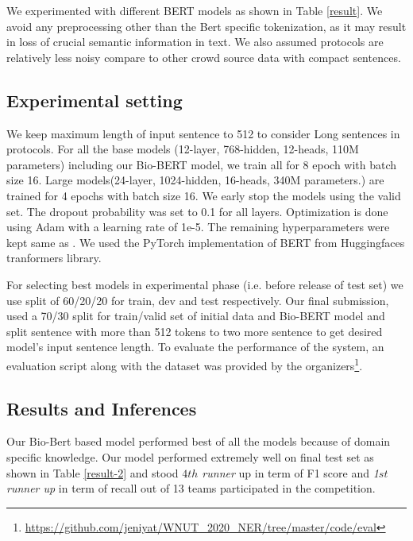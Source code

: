 \documentclass[11pt,a4paper]{article}
\begin{document}
We experimented with different BERT models as shown in Table \ref{result}. We avoid any preprocessing other than the Bert specific tokenization, as it may result in loss of crucial semantic information in text. We also assumed protocols are relatively less noisy compare to other crowd source data with  compact sentences.
\subsection{Experimental setting}
We keep maximum length of input sentence to 512 to consider Long sentences in protocols. For all the base models (12-layer, 768-hidden, 12-heads, 110M parameters) including our Bio-BERT model, we train all for 8 epoch with batch size 16. Large models(24-layer, 1024-hidden, 16-heads, 340M parameters.) are trained for 4 epochs with batch size 16. We early stop the models using the valid set. The dropout probability was set to 0.1 for all layers. Optimization is done using Adam\cite{article1} with a learning rate of 1e-5. The remaining hyperparameters were kept same as \citet{devlin2018pretraining}. We used the PyTorch \cite{NEURIPS2019_9015} implementation of BERT from Huggingfaces tranformers \cite{Wolf2019HuggingFacesTS} library.

For selecting best models in experimental phase (i.e. before release of test set) we use split of 60/20/20 for train, dev and test respectively. Our final submission, used a 70/30 split for train/valid set of initial data and Bio-BERT\cite{10.1093/bioinformatics/btz682} model and split sentence with more than 512 tokens to two more sentence to get desired  model's  input sentence length. To evaluate the performance of the system, an evaluation script along with the dataset was provided by the organizers\footnote{\url{https://github.com/jeniyat/WNUT_2020_NER/tree/master/code/eval}}.



\subsection{Results and Inferences}

Our Bio-Bert\cite{10.1093/bioinformatics/btz682} based model performed best of all the models because of domain specific knowledge. Our model performed extremely well on final test set as shown in Table \ref{result-2} and stood \textit{\(4th\) runner} up in term of F1 score and\textit{ 1\(st\) runner up} in term of recall out of 13 teams participated in the competition. 
\end{document}
